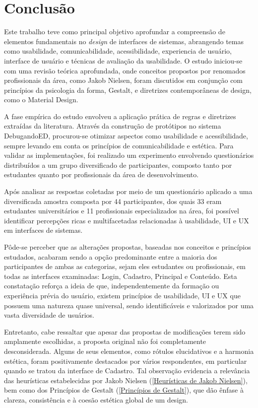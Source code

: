 \chapter[Conclusão]{Conclusão}
\label{capConclusao}

Este trabalho teve como principal objetivo aprofundar a compreensão de elementos fundamentais no \textit{design} de interfaces de sistemas, abrangendo temas como usabilidade, comunicabilidade, acessibilidade, experiencia de usuário, interface de usuário e técnicas de avaliação da usabilidade. O estudo iniciou-se com uma revisão teórica aprofundada, onde conceitos propostos por renomados profissionais da área, como Jakob Nielsen, foram discutidos em conjunção com princípios da psicologia da forma, Gestalt, e diretrizes contemporâneas de design, como o Material Design.

A fase empírica do estudo envolveu a aplicação prática de regras e diretrizes extraídas da literatura. Através da construção de protótipos no sistema DebugandoED, procurou-se otimizar aspectos como usabilidade e acessibilidade, sempre levando em conta os princípios de comunicabilidade e estética. Para validar as implementações, foi realizado um experimento envolvendo questionários distribuídos a um grupo diversificado de participantes, composto tanto por estudantes quanto por profissionais da área de desenvolvimento.

Após analisar as respostas coletadas por meio de um questionário aplicado a uma diversificada amostra composta por 44 participantes, dos quais 33 eram estudantes universitários e 11 profissionais especializados na área, foi possível identificar percepções ricas e multifacetadas relacionadas à usabilidade, \ac{UI} e \ac{UX} em interfaces de sistemas.

Pôde-se perceber que as alterações propostas, baseadas nos conceitos e princípios estudados, acabaram sendo a opção predominante entre a maioria dos participantes de ambas as categorias, sejam eles estudantes ou profissionais, em todas as interfaces examinadas: Login, Cadastro, Principal e Conteúdo. Esta constatação reforça a ideia de que, independentemente da formação ou experiência prévia do usuário, existem princípios de usabilidade, \ac{UI} e \ac{UX} que possuem uma natureza quase universal, sendo identificáveis e valorizados por uma vasta diversidade de usuários.

Entretanto, cabe ressaltar que apesar das propostas de modificações terem sido amplamente escolhidas, a proposta original não foi completamente desconsiderada. Alguns de seus elementos, como rótulos elucidativos e a harmonia estética, foram positivamente destacados por vários respondentes, em particular quando se tratou da interface de Cadastro. Tal observação evidencia a relevância das heurísticas estabelecidas por Jakob Nielsen (\ref{Heurísticas de Jakob Nielsen}), bem como dos  Princípios de Gestalt (\ref{Princípios de Gestalt}), que dão ênfase à clareza, consistência e à coesão estética global de um design.

